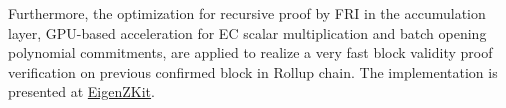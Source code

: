 \documentclass{article}
\begin{document}
Furthermore, the optimization for recursive proof by FRI in the accumulation layer, GPU-based acceleration for EC scalar multiplication and batch opening polynomial commitments, are applied to realize a very fast block validity proof verification on previous confirmed block in Rollup chain. The implementation is presented at \href{https://github.com/0xEigenLabs/EigenZKit}{EigenZKit}.


\begin{appendices}

\end{appendices}




\end{document}
